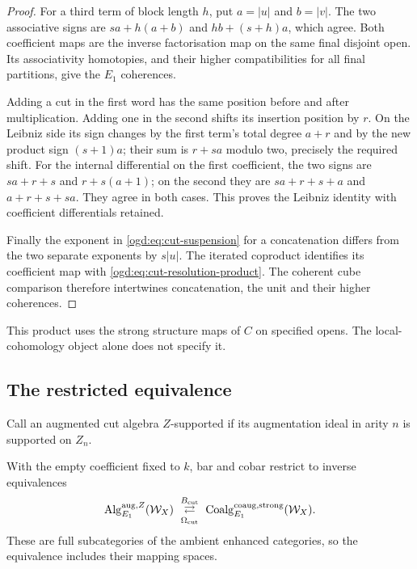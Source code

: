 \begin{proof}
For a third term of block length $h$, put $a=|u|$ and $b=|v|$.
The two associative signs are $sa+h(a+b)$ and $hb+(s+h)a$, which agree.
Both coefficient maps are the inverse factorisation map on the same
final disjoint open. Its associativity homotopies, and their higher
compatibilities for all final partitions, give the $E_1$ coherences.

Adding a cut in the first word has the same position before and after
multiplication. Adding one in the second shifts its insertion position
by $r$. On the Leibniz side its sign changes by the first term's total
degree $a+r$ and by the new product sign $(s+1)a$; their sum is
$r+sa$ modulo two, precisely the required shift.
For the internal differential on the first coefficient, the two signs
are $sa+r+s$ and $r+s(a+1)$; on the second they are
$sa+r+s+a$ and $a+r+s+sa$. They agree in both cases.
This proves the Leibniz identity with coefficient differentials retained.

Finally the exponent in \eqref{ogd:eq:cut-suspension} for a concatenation
differs from the two separate exponents by $s|u|$.
The iterated coproduct identifies its coefficient map with
\eqref{ogd:eq:cut-resolution-product}. The coherent cube comparison
therefore intertwines concatenation, the unit and their higher coherences.
\end{proof}

This product uses the strong structure maps of $C$ on specified opens.
The local-cohomology object alone does not specify it.

\subsection{The restricted equivalence}

Call an augmented cut algebra $Z$-supported if its augmentation ideal
in arity $n$ is supported on $Z_n$.

\begin{theorem}\label{ogd:thm:Z-restriction}
With the empty coefficient fixed to $k$, bar and cobar restrict to
inverse equivalences
\[
 \operatorname{Alg}_{E_1}^{\mathrm{aug},Z}(\mathcal W_X)
 \ \underset{\Omega_{\mathrm{cut}}}{\overset{B_{\mathrm{cut}}}
 {\rightleftarrows}}\
 \operatorname{Coalg}_{E_1}^{\mathrm{coaug},\mathrm{strong}}(\mathcal W_X).
\]
These are full subcategories of the ambient enhanced categories, so the
equivalence includes their mapping spaces.
\end{theorem}

